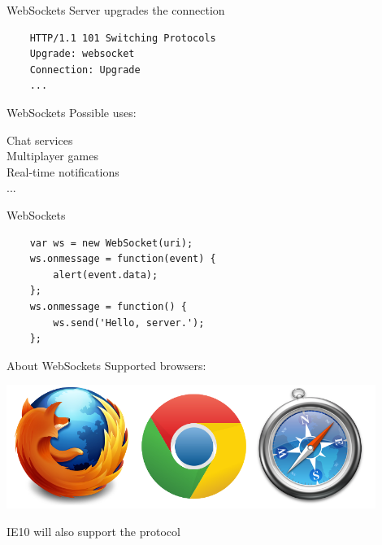 \documentclass[20pt]{beamer}
\newcommand{\vspaced}{
    \vspace{5mm}
}
\begin{document}
\begin{frame}[fragile]{WebSockets}
    Server upgrades the connection
    \vspaced
    \begin{lstlisting}
    HTTP/1.1 101 Switching Protocols
    Upgrade: websocket
    Connection: Upgrade
    ...
    \end{lstlisting}
\end{frame}

\begin{frame}{WebSockets}
    Possible uses: \\
    \vspaced
    Chat services \\
    Multiplayer games \\
    Real-time notifications \\
    ...
\end{frame}

\begin{frame}[fragile]{WebSockets}
    \begin{lstlisting}
    var ws = new WebSocket(uri);
    ws.onmessage = function(event) {
        alert(event.data);
    };
    ws.onmessage = function() {
        ws.send('Hello, server.');
    };
    \end{lstlisting}
\end{frame}

\begin{frame}{About WebSockets}
    Supported browsers:
    \begin{center}
    \includegraphics[width=0.9\textwidth]{images/browsers.png}
    \end{center}
    IE10 will also support the protocol
\end{frame}






\end{document}
